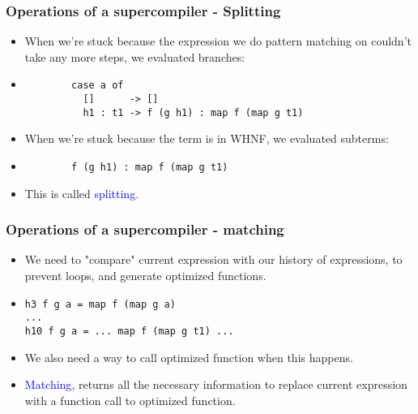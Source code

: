 \documentclass{beamer}
\begin{document}
\begin{frame}[fragile]

    \frametitle{Operations of a supercompiler - Splitting}

    \begin{itemize}[<+->]

        \item[]
            When we're stuck because the expression we do pattern matching on
            couldn't take any more steps, we evaluated branches:

        \item[]
            \begin{verbatim}
        case a of
          []      -> []
          h1 : t1 -> f (g h1) : map f (map g t1)
            \end{verbatim}

        \item[]
            When we're stuck because the term is in WHNF, we evaluated subterms:

        \item[]
            \begin{verbatim}
        f (g h1) : map f (map g t1)
            \end{verbatim}

        \item[]
            This is called \textcolor{blue}{splitting}.

    \end{itemize}

\end{frame}

\begin{frame}[fragile]

    \frametitle{Operations of a supercompiler - matching}

    \begin{itemize}[<+->]
        \item[]
            We need to "compare" current expression with our history of
            expressions, to prevent loops, and generate optimized functions.

        \item[]
            \begin{verbatim}
h3 f g a = map f (map g a)
...
h10 f g a = ... map f (map g t1) ...
            \end{verbatim}

        \item[]
            We also need a way to call optimized function when this happens.

        \item[]
            \textcolor{blue}{Matching}, returns all the necessary information to
            replace current expression with a function call to optimized
            function.

    \end{itemize}

\end{frame}
\end{document}
